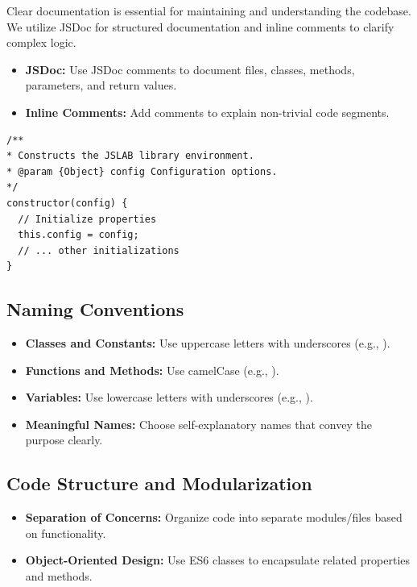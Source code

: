 \documentclass[12pt,a4paper]{article}
\begin{document}
Clear documentation is essential for maintaining and understanding the codebase. We utilize JSDoc for structured documentation and inline comments to clarify complex logic.

\begin{itemize}
  \item \textbf{JSDoc:} Use JSDoc comments to document files, classes, methods, parameters, and return values.
  
  \item \textbf{Inline Comments:} Add comments to explain non-trivial code segments.
\end{itemize}

\begin{lstlisting}[style=JavaScriptStyle]
/**
* Constructs the JSLAB library environment.
* @param {Object} config Configuration options.
*/
constructor(config) {
  // Initialize properties
  this.config = config;
  // ... other initializations
}
\end{lstlisting}

\subsection{Naming Conventions}
\begin{itemize}
  \item \textbf{Classes and Constants:} Use uppercase letters with underscores (e.g., ).
  
  \item \textbf{Functions and Methods:} Use camelCase (e.g., ).
  
  \item \textbf{Variables:} Use lowercase letters with underscores (e.g., ).
  
  \item \textbf{Meaningful Names:} Choose self-explanatory names that convey the purpose clearly.
\end{itemize}

\subsection{Code Structure and Modularization}
\begin{itemize}
  \item \textbf{Separation of Concerns:} Organize code into separate modules/files based on functionality.
  
  \item \textbf{Object-Oriented Design:} Use ES6 classes to encapsulate related properties and methods.
\end{itemize}
\end{document}
